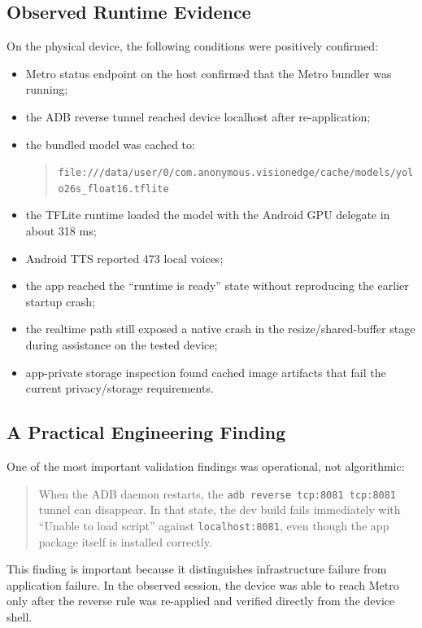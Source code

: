 \documentclass[conference]{IEEEtran}
\newcommand{\codepath}[1]{\begingroup\urlstyle{tt}\nolinkurl{#1}\endgroup}
\newcommand{\codeid}[1]{\begingroup\urlstyle{tt}\nolinkurl{#1}\endgroup}
\begin{document}
\subsection{Observed Runtime Evidence}
On the physical device, the following conditions were positively confirmed:
\begin{itemize}[leftmargin=1.2em]
\item Metro status endpoint on the host confirmed that the Metro bundler was running;
\item the ADB reverse tunnel reached device localhost after re-application;
\item the bundled model was cached to:
\begin{quote}
\codepath{file:///data/user/0/com.anonymous.visionedge/cache/models/yolo26s_float16.tflite}
\end{quote}
\item the TFLite runtime loaded the model with the Android GPU delegate in about 318 ms;
\item Android TTS reported 473 local voices;
\item the app reached the ``runtime is ready'' state without reproducing the earlier startup crash;
\item the realtime path still exposed a native crash in the resize/shared-buffer stage during assistance on the tested device;
\item app-private storage inspection found cached image artifacts that fail the current privacy/storage requirements.
\end{itemize}

\subsection{A Practical Engineering Finding}
One of the most important validation findings was operational, not algorithmic:
\begin{quote}
When the ADB daemon restarts, the \codeid{adb reverse tcp:8081 tcp:8081} tunnel can disappear. In that state, the dev build fails immediately with ``Unable to load script'' against \codeid{localhost:8081}, even though the app package itself is installed correctly.
\end{quote}

This finding is important because it distinguishes infrastructure failure from application failure. In the observed session, the device was able to reach Metro only after the reverse rule was re-applied and verified directly from the device shell.
\end{document}
